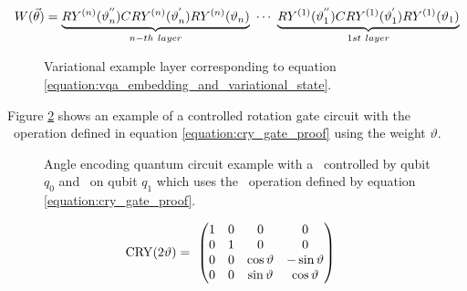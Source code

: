 \begin{equation} 
    \centering
    \begin{split}
        W(\vec{\theta}) = \underbrace{RY^{(n)}(\vartheta_{n}^{''}) CRY^{(n)}(\vartheta_{n}^{'}) RY^{(n)}(\vartheta_{n})}_{n-th\ layer}\ \cdots\ \underbrace{RY^{(1)}(\vartheta_{1}^{''}) CRY^{(1)}(\vartheta_{1}^{'}) RY^{(1)}(\vartheta_{1})}_{1st\ layer}
    \end{split}
    \label{equation:vqa_embedding_and_variational_state}
\end{equation}

\clearpage

\begin{figure}[!h]
    \centering
    \caption{Variational example layer corresponding to equation \ref{equation:vqa_embedding_and_variational_state}.}
    \label{fig:variational_example_layer}
\end{figure}

Figure \ref{fig:cry_angle_embedding} shows an example of a controlled rotation gate circuit with the \crygate\ operation defined in equation \ref{equation:cry_gate_proof} using the weight $\vartheta$. 

\begin{figure}[!h]
    \centering
    \caption{Angle encoding quantum circuit example with a \crygate\ controlled by qubit $q_0$ and \rygate\ on qubit $q_1$ which uses the \crygate\ operation defined by equation \ref{equation:cry_gate_proof}.}
    \label{fig:cry_angle_embedding}
\end{figure}

\begin{equation}
    \centering
    \begin{split}
        \mathrm{CRY}(2\vartheta) &=\  
        \begin{pmatrix}
            1 & 0 & 0 & 0 \\
            0 & 1 & 0 & 0 \\
            0 & 0 & \cos{\vartheta} & -\sin{\vartheta} \\
            0 & 0 & \sin{\vartheta} &  \cos{\vartheta}
        \end{pmatrix}
    \end{split}
    \label{equation:cry_gate_proof}
\end{equation}

